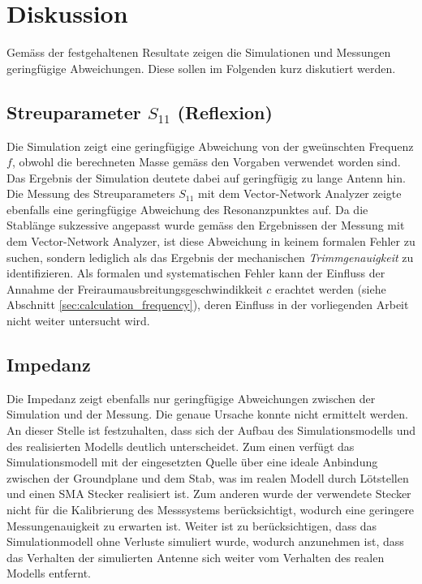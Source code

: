 \section{Diskussion}


Gemäss der festgehaltenen Resultate zeigen die Simulationen und Messungen
geringfügige Abweichungen. Diese sollen im Folgenden kurz diskutiert
werden.

\subsection{Streuparameter $S_{11}$ (Reflexion)}
Die Simulation zeigt eine geringfügige Abweichung von der gweünschten
Frequenz $f$, obwohl die berechneten Masse gemäss den Vorgaben verwendet
worden sind. Das Ergebnis der Simulation deutete dabei auf geringfügig zu
lange Antenn hin. Die Messung des Streuparameters $S_{11}$ mit dem
Vector-Network Analyzer zeigte ebenfalls eine geringfügige Abweichung des
Resonanzpunktes auf. Da die Stablänge sukzessive angepasst wurde gemäss den
Ergebnissen der Messung mit dem Vector-Network Analyzer, ist diese Abweichung
in keinem formalen Fehler zu suchen, sondern lediglich als das Ergebnis der
mechanischen \emph{Trimmgenauigkeit} zu identifizieren. Als formalen
und systematischen Fehler kann der Einfluss der Annahme der
Freiraumausbreitungsgeschwindikkeit $c$ erachtet werden (siehe
Abschnitt \ref{sec:calculation_frequency}), deren Einfluss in der
vorliegenden Arbeit nicht weiter untersucht wird.

\subsection{Impedanz}
Die Impedanz zeigt ebenfalls nur geringfügige Abweichungen zwischen
der Simulation und der Messung. Die genaue Ursache konnte nicht
ermittelt werden. An dieser Stelle ist festzuhalten, dass sich
der Aufbau des Simulationsmodells und des realisierten Modells deutlich
unterscheidet. Zum einen verfügt das Simulationsmodell mit der
eingesetzten Quelle über eine ideale Anbindung zwischen der Groundplane
und dem Stab, was im realen Modell durch Lötstellen und einen SMA
Stecker realisiert ist. Zum anderen wurde der verwendete Stecker
nicht für die Kalibrierung des Messsystems berücksichtigt, wodurch
eine geringere Messungenauigkeit zu erwarten ist. Weiter ist zu
berücksichtigen, dass das Simulationmodell ohne Verluste simuliert
wurde, wodurch anzunehmen ist, dass das Verhalten der simulierten
Antenne sich weiter vom Verhalten des realen Modells entfernt.

